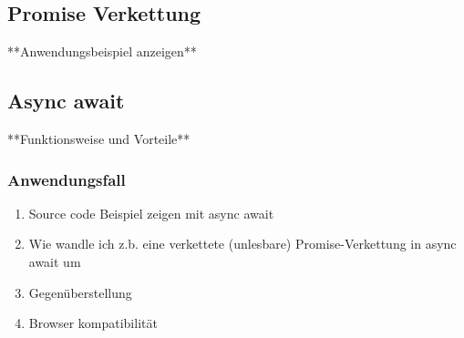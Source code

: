 \subsection{Promise Verkettung}
**Anwendungsbeispiel anzeigen**

\subsection{Async await}
**Funktionsweise und Vorteile**

\subsubsection{Anwendungsfall}

\begin{enumerate} 
\item Source code Beispiel zeigen mit async await
\item Wie wandle ich z.b. eine verkettete (unlesbare) Promise-Verkettung in async await um 
\item Gegenüberstellung
\item Browser kompatibilität
\end{enumerate}



